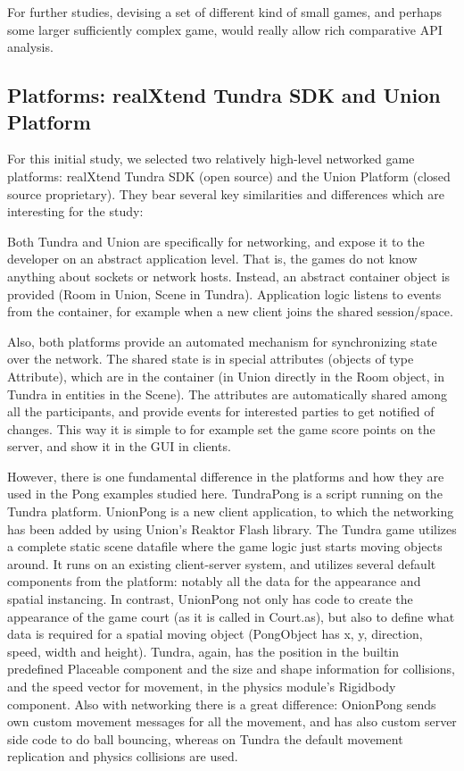 \documentclass[conference]{IEEEtran}
\begin{document}
For further studies, devising a set of different kind of small games,
and perhaps some larger sufficiently complex game, would really allow
rich comparative API analysis.


\subsection{Platforms: realXtend Tundra SDK and Union Platform%
  \label{platforms-realxtend-tundra-sdk-and-union-platform}%
}

For this initial study, we selected two relatively high-level
networked game platforms: realXtend Tundra SDK (open source) and the
Union Platform (closed source proprietary). They bear several key
similarities and differences which are interesting for the study:

Both Tundra and Union are specifically for networking, and expose it
to the developer on an abstract application level. That is, the games
do not know anything about sockets or network hosts. Instead, an
abstract container object is provided (Room in Union, Scene in
Tundra). Application logic listens to events from the container, for
example when a new client joins the shared session/space.

Also, both platforms provide an automated mechanism for synchronizing
state over the network. The shared state is in special attributes
(objects of type Attribute), which are in the container (in Union
directly in the Room object, in Tundra in entities in the Scene). The
attributes are automatically shared among all the participants, and
provide events for interested parties to get notified of changes. This
way it is simple to for example set the game score points on the
server, and show it in the GUI in clients.

However, there is one fundamental difference in the platforms and how
they are used in the Pong examples studied here. TundraPong is a
script running on the Tundra platform. UnionPong is a new client
application, to which the networking has been added by using Union's
Reaktor Flash library. The Tundra game utilizes a complete static
scene datafile where the game logic just starts moving objects
around. It runs on an existing client-server system, and utilizes
several default components from the platform: notably all the data for
the appearance and spatial instancing. In contrast, UnionPong not only
has code to create the appearance of the game court (as it is called
in Court.as), but also to define what data is required for a spatial
moving object (PongObject has x, y, direction, speed, width and
height). Tundra, again, has the position in the builtin predefined
Placeable component and the size and shape information for collisions,
and the speed vector for movement, in the physics module's Rigidbody
component. Also with networking there is a great difference: OnionPong
sends own custom movement messages for all the movement, and has also
custom server side code to do ball bouncing, whereas on Tundra the
default movement replication and physics collisions are used.
\end{document}
